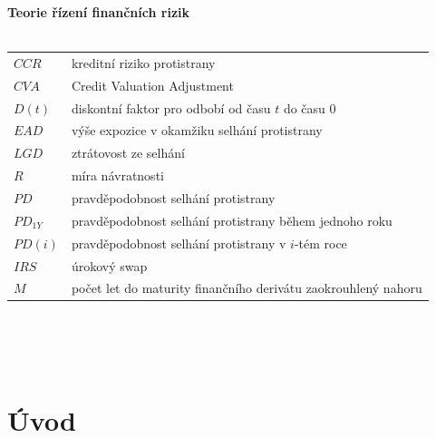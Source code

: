 \documentclass[a4paper,12pt]{report}
\theoremstyle{definition} \newtheorem{definice}[veta]{Definice}
\theoremstyle{remark}
\begin{document}
%
%
%
\newpage \noindent
\textbf{Teorie řízení finančních rizik}\\\\
   \begin{tabular}{p{4cm} p{9.3cm}}
   $CCR$ 								& kreditní riziko protistrany\\
   $CVA$								& Credit Valuation Adjustment\\
   $D(t)$								& diskontní faktor pro odbobí od času $t$ do času 0\\
   $EAD$								& výše expozice v okamžiku selhání protistrany\\
   $LGD$								& ztrátovost ze selhání\\
   $R$									& míra návratnosti\\
   $PD$								& pravděpodobnost selhání protistrany\\
   $PD_{1Y}$								& pravděpodobnost selhání protistrany během jednoho roku\\
   $PD(i)$								& pravděpodobnost selhání protistrany v $i$-tém roce\\
   $IRS$								& úrokový swap\\
   $M$									& počet let do maturity finančního derivátu zaokrouhlený nahoru\\
\end{tabular}\\\\\\
%
%
%

\chapter*{Úvod} 
\pagestyle{plain}
\setcounter{page}{1}





\end{document}
